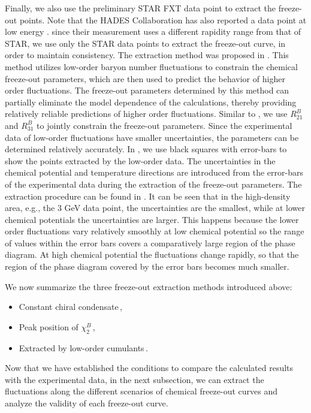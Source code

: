 \documentclass[aps,twocolumn,prd,superscriptaddress,nofootinbib,floatfix]{revtex4-2}
\def\Fig#1{\Cref{#1}}
\begin{document}
Finally, we also use the preliminary STAR FXT data point to extract the freeze-out points. Note that the HADES Collaboration has also reported a data point at low energy \cite{HADES:2020wpc}. since their measurement uses a different rapidity range from that of STAR, we use only the STAR data points to extract the freeze-out curve, in order to maintain consistency. The extraction method was proposed in \cite{Lu:2026ezr}. This method utilizes low-order baryon number fluctuations to constrain the chemical freeze-out parameters, which are then used to predict the behavior of higher order fluctuations. The freeze-out parameters determined by this method can partially eliminate the model dependence of the calculations, thereby providing relatively reliable predictions of higher order fluctuations. Similar to \cite{Lu:2026ezr}, we use $R^B_{21}$ and $R^B_{31}$ to jointly constrain the freeze-out parameters. Since the experimental data of low-order fluctuations have smaller uncertainties, the parameters can be determined relatively accurately. In \Fig{fig:phasePDM_all}, we use black squares with error-bars to show the points extracted by the low-order data. The uncertainties in the chemical potential and temperature directions are introduced from the error-bars of the experimental data during the extraction of the freeze-out parameters. The extraction procedure can be found in . It can be seen that in the high-density area, e.g., the 3 GeV data point, the uncertainties are the smallest, while at lower chemical potentials the uncertainties are larger. This happens because the lower order fluctuations vary relatively smoothly at low chemical potential so the range of values within the error bars covers a comparatively large region of the phase diagram. At high chemical potential the fluctuations change rapidly, so that the region of the phase diagram covered by the error bars becomes much smaller.

We now summarize the three freeze-out extraction methods introduced above:
%
\begin{itemize}
    \item Constant chiral condensate\,,
    \item Peak position of $\chi^B_2$\,,
    \item Extracted by low-order cumulants\,.
\end{itemize}
%

Now that we have established the conditions to compare the calculated results with the experimental data, in the next subsection, we can extract the fluctuations along the different scenarios of chemical freeze-out curves and analyze the validity of each freeze-out curve.
\end{document}
